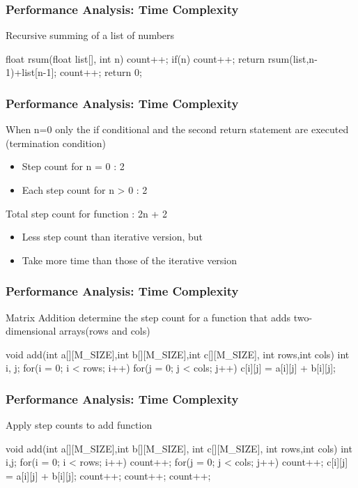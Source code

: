 \documentclass[newPxFont,sthlmFooter,nooffset]{beamer}
\begin{document}
\begin{frame}[t,fragile]
  \frametitle{Performance Analysis: Time Complexity}
Recursive summing of a list of numbers
\begin{codedef}
float rsum(float list[], int n) {
   count++;
   if(n) {
      count++;
      return rsum(list,n-1)+list[n-1]; 
   }
   count++;
   return 0; 
}
\end{codedef}
\end{frame}


\begin{frame}[t]
  \frametitle{Performance Analysis: Time Complexity}
When n=0 only the if conditional and the second return statement are executed (termination condition)

\begin{itemize}
\item Step count for n = 0 : 2
\item Each step count for n > 0 : 2
\end{itemize}

Total step count for function : 2n + 2
\begin{itemize}
\item Less step count than iterative version, but
\item Take more time than those of the iterative version
\end{itemize}

\end{frame}


\begin{frame}[t, fragile]
  \frametitle{Performance Analysis: Time Complexity}
Matrix Addition determine the step count for a function that adds
two-dimensional arrays(rows and cols)
\begin{codedef}
void add(int a[][M_SIZE],int b[][M_SIZE],int c[][M_SIZE],
         int rows,int cols) {
   int i, j;
   for(i = 0; i < rows; i++)
      for(j = 0; j < cols; j++) 
         c[i][j] = a[i][j] + b[i][j];
}
\end{codedef}
\end{frame}


\begin{frame}[t, fragile]
  \frametitle{Performance Analysis: Time Complexity}
Apply step counts to add function
\begin{codedef}
void add(int a[][M_SIZE],int b[][M_SIZE], int c[][M_SIZE],
         int rows,int cols) {
   int i,j;
   for(i = 0; i < rows; i++) {
      count++;
      for(j = 0; j < cols; j++) {
         count++;
         c[i][j] = a[i][j] + b[i][j];
         count++;
      }
      count++; 
   }
   count++; 
}
\end{codedef}
\end{frame}
\end{document}
